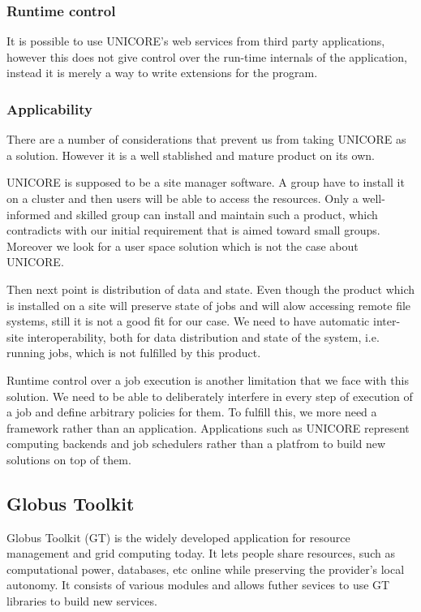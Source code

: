 \subsubsection {Runtime control}
It is possible to use UNICORE's web services from third party applications, however this does 
not give control over the run-time internals of the application, instead it is merely a way 
to write extensions for the program.
\subsubsection {Applicability}
There are a number of considerations that prevent us from taking UNICORE as a solution. However
it is a well stablished and mature product on its own.

UNICORE is supposed to be a site manager software. A group have to install it on a cluster and
then users will be able to access the resources. Only a well-informed and skilled group can 
install and maintain such a product, which contradicts with our initial requirement that is 
aimed toward small groups. Moreover we look for a user space solution which is not the case
about UNICORE.

Then next point is distribution of data and state. Even though the product which is installed
on a site will preserve state of jobs and will alow accessing remote file systems, still it is
not a good fit for our case. We need to have automatic inter-site interoperability, both for
data distribution and state of the system, i.e. running jobs, which is not fulfilled by this
product.

Runtime control over a job execution is another limitation that we face with this solution.
We need to be able to deliberately interfere in every step of execution of a job and define 
arbitrary policies for them. To fulfill this, we more need a framework rather than an application.
Applications such as UNICORE represent computing backends and job schedulers rather than a 
platfrom to build new solutions on top of them.

\subsection{Globus Toolkit}
Globus Toolkit (GT) is the widely developed application for resource management and grid computing today.\cite{eickermann2005steering}
It lets people share resources, such as computational power, databases, etc online while preserving the
provider's local autonomy. It consists of various modules and allows futher sevices
to use GT libraries to build new services.\cite{foster2005network}


